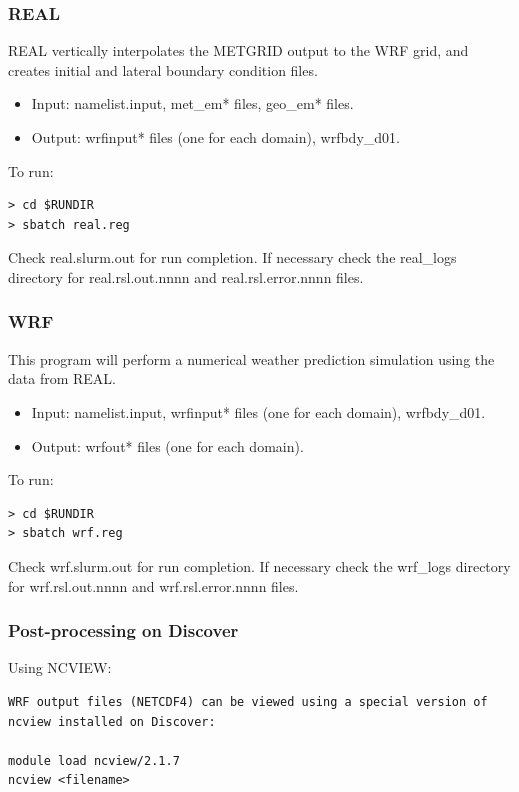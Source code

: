 \begin{frame}[fragile]\frametitle{REAL}

\footnotesize{
REAL vertically interpolates the METGRID output to the WRF grid, and creates initial and lateral boundary condition files.
\begin{itemize}
\item Input: namelist.input, met\_em*  files, geo\_em* files.
\item Output: wrfinput* files (one for each domain), wrfbdy\_d01.
\end{itemize}
}    
\hrulefill\par
\footnotesize{To run:}
\begin{lstlisting}
> cd $RUNDIR
> sbatch real.reg
\end{lstlisting}
Check real.slurm.out for run completion.
If necessary check the real\_logs directory for real.rsl.out.nnnn and real.rsl.error.nnnn files.


\end{frame}

\begin{frame}[fragile]\frametitle{WRF}

\footnotesize{
This program will perform a numerical weather prediction simulation using the data from REAL.
\begin{itemize}
\item Input: namelist.input, wrfinput* files (one for each domain), wrfbdy\_d01.
\item Output: wrfout* files (one for each domain).
\end{itemize}
}    
\hrulefill\par
\footnotesize{To run:}
\begin{lstlisting}
> cd $RUNDIR
> sbatch wrf.reg
\end{lstlisting}

Check wrf.slurm.out for run completion.
If necessary check the wrf\_logs directory for wrf.rsl.out.nnnn and wrf.rsl.error.nnnn files.

\end{frame}

\begin{frame}[fragile]
\frametitle{Post-processing on Discover}

Using NCVIEW:

\begin{lstlisting}
WRF output files (NETCDF4) can be viewed using a special version of ncview installed on Discover:

module load ncview/2.1.7
ncview <filename>
\end{lstlisting}

\end{frame}

